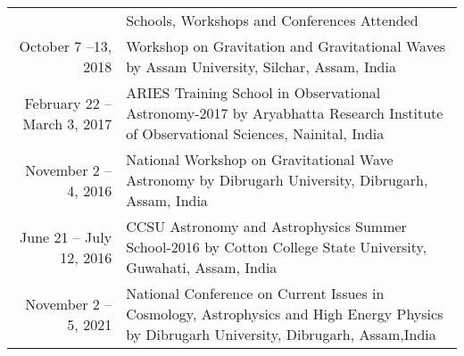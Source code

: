 \documentclass[a4paper, 11pt]{article}
\newcommand{\headingfont}{\Large\color{Bittersweet}}
\newenvironment{SectionTable}[1]{
	\renewcommand*{\arraystretch}{1.7}
	\setlength{\tabcolsep}{10pt}
	\begin{longtable}{Rp{5.2in}} & #1 \\}
{\end{longtable}\vspace{-.3cm}}
\begin{document}
\begin{SectionTable}{\headingfont Schools, Workshops and Conferences Attended}
October 7 --13, 2018 &
Workshop on Gravitation and Gravitational Waves by Assam University, Silchar, Assam, India
\\

February 22 -- March 3, 2017 &
ARIES Training School in Observational Astronomy-2017 by Aryabhatta Research Institute of Observational Sciences, Nainital, India
\\

November 2 -- 4, 2016 &
National Workshop on Gravitational Wave Astronomy by Dibrugarh University, Dibrugarh, Assam, India
\\

June 21 -- July 12, 2016 &
CCSU Astronomy and Astrophysics Summer School-2016 by Cotton College State University, Guwahati, Assam, India
\\

November 2 -- 5, 2021 &
National Conference on Current Issues in Cosmology, Astrophysics and High Energy Physics by Dibrugarh University, Dibrugarh, Assam,India
\\
\end{SectionTable}














\end{document}
